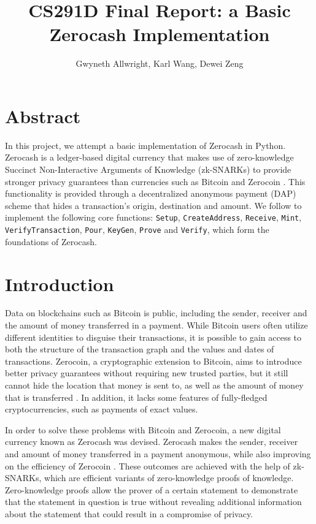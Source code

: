 \documentclass{article}
\begin{document}
\title{CS291D Final Report: a Basic Zerocash Implementation}
\author{Gwyneth Allwright, Karl Wang, Dewei Zeng}

\maketitle

\section*{Abstract}
In this project, we attempt a basic implementation of Zerocash \cite{zerocash} in Python. Zerocash is a ledger-based digital currency that makes use of zero-knowledge Succinct Non-Interactive Arguments of Knowledge (zk-SNARKs) to provide stronger privacy guarantees than currencies such as Bitcoin \cite{bitcoin} and Zerocoin \cite{zerocoin}. This functionality is provided through a decentralized anonymous payment (DAP) scheme that hides a transaction's origin, destination and amount. We follow \cite{zerocash} to implement the following core functions: \texttt{Setup}, \texttt{CreateAddress}, \texttt{Receive}, \texttt{Mint}, \texttt{VerifyTransaction}, \texttt{Pour}, \texttt{KeyGen}, \texttt{Prove} and \texttt{Verify}, which form the foundations of Zerocash.

\tableofcontents

\newpage

\section{Introduction}
Data on blockchains such as Bitcoin is public, including the sender, receiver and the amount of money transferred in a payment. While Bitcoin users often utilize different identities to disguise their transactions, it is possible to gain access to both the structure of the transaction graph and the values and dates of transactions. Zerocoin, a cryptographic extension to Bitcoin, aims to introduce better privacy guarantees without requiring new trusted parties, but it still cannot hide the location that money is sent to, as well as the amount of money that is transferred \cite{zerocoin}. In addition, it lacks some features of fully-fledged cryptocurrencies, such as payments of exact values.

In order to solve these problems with Bitcoin and Zerocoin, a new digital currency known as Zerocash was devised. Zerocash makes the sender, receiver and amount of money transferred in a payment anonymous, while also improving on the efficiency of Zerocoin \cite{zerocash}. These outcomes are achieved with the help of zk-SNARKs, which are efficient variants of zero-knowledge proofs of knowledge. Zero-knowledge proofs allow the prover of a certain statement to demonstrate that the statement in question is true without revealing additional information about the statement that could result in a compromise of privacy.
\end{document}
